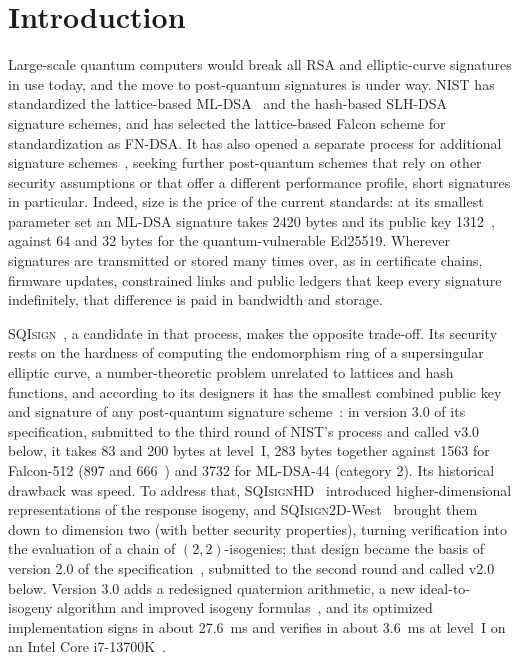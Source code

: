\documentclass[version=submission]{iacrcc}
\newcommand{\SQIsign}{{SQI}\textsc{sign}}
\begin{document}
\section{Introduction}
\label{sec:intro}

Large-scale quantum computers would break all RSA and elliptic-curve signatures in use today, and the move to post-quantum signatures is under way.
NIST has standardized the lattice-based ML-DSA~\cite{fips204} and the hash-based SLH-DSA~\cite{fips205} signature schemes, and has selected the lattice-based Falcon scheme for standardization as FN-DSA.
It has also opened a separate process for additional signature
schemes~\cite{nist-onramp}, seeking further post-quantum schemes that rely on other security assumptions or that offer a different performance profile, short signatures in particular.
Indeed, size is the price of the current standards: at its smallest parameter set an ML-DSA signature takes 2420 bytes and its public key 1312~\cite{fips204}, against 64 and 32 bytes for the quantum-vulnerable Ed25519.
Wherever signatures are transmitted or stored many times over, as in certificate chains, firmware updates, constrained links and public ledgers that keep every signature indefinitely, that difference is paid in bandwidth and storage.

{\SQIsign}~\cite{sqisign-spec-r3}, a candidate in that process, makes
the opposite trade-off.
Its security rests on the hardness of computing the endomorphism ring of a supersingular elliptic curve, a number-theoretic problem unrelated to lattices and hash functions, and according to its designers it has the smallest combined public key and signature of any post-quantum signature scheme~\cite[Section~1.1]{sqisign-spec-r3}: in version 3.0 of its specification, submitted to the third round of NIST's process and called v3.0 below, it takes 83 and 200 bytes at level~I, 283 bytes together against 1563 for Falcon-512 (897 and 666~\cite{falcon}) and 3732 for ML-DSA-44 (category 2).
Its historical drawback was speed.
To address that, {\SQIsign}HD~\cite{sqisignhd} introduced higher-dimensional representations of the response isogeny, and {\SQIsign}2D-West~\cite{sqisign2d-west} brought them down to dimension two (with better security properties), turning verification into the evaluation of a chain of $(2,2)$-isogenies; that design became the basis of version 2.0 of the specification~\cite{sqisign-spec-r2}, submitted to the second round and called v2.0 below.
Version 3.0 adds a redesigned quaternion arithmetic, a new ideal-to-isogeny algorithm and improved isogeny formulas~\cite[Section~1.4]{sqisign-spec-r3}, and its optimized implementation signs in about 27.6~ms and verifies in about 3.6~ms at level~I on an Intel Core i7-13700K~\cite[Section~1.1]{sqisign-spec-r3}.
\end{document}
